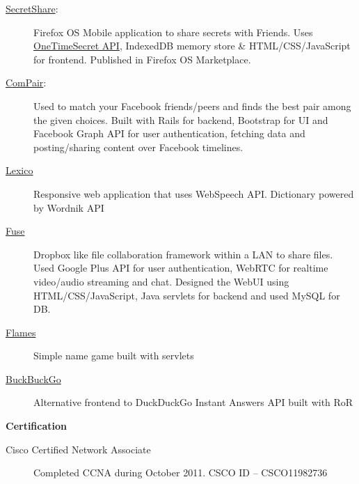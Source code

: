 \documentclass[letterpaper,11pt]{article}
\newcommand{\resheading}[1]{{\large \colorbox{mygrey}{\begin{minipage}{\textwidth}{\textbf{#1 \vphantom{p\^{E}}}}\end{minipage}}}}
\begin{document}
\begin{description}
\item[\href{https://github.com/dtsdwarak/secretshare}{SecretShare}:] { \footnotesize Firefox OS Mobile application to share secrets with Friends. Uses \href{https://onetimesecret.com/}{OneTimeSecret API}, IndexedDB memory store \& HTML/CSS/JavaScript for frontend. Published in Firefox OS Marketplace.}

\item[\href{https://github.com/dtsdwarak/compair}{ComPair}:] { \footnotesize Used to match your Facebook friends/peers and finds the best pair among the given choices. Built with Rails for backend, Bootstrap for UI and Facebook Graph API for user authentication, fetching data and posting/sharing content over Facebook timelines.\color{red}{\bf Won the best creative appliation award at RedHat's OpenShift DevConf 2014, Czech Republic}}

\item[\href{https://dtsdwarak.github.io/lexico/}{Lexico}] { \footnotesize Responsive web application that uses WebSpeech API. Dictionary powered by Wordnik API}

\item[\href{https://github.com/dtsdwarak/fuse}{Fuse}] { \footnotesize Dropbox like file collaboration framework within a LAN to share files. Used Google Plus API for user authentication, WebRTC for realtime video/audio streaming and chat. Designed the WebUI using HTML/CSS/JavaScript, Java servlets for backend and used MySQL for DB.}

\item[\href{https://github.com/dtsdwarak/flames/}{Flames}] { \footnotesize Simple name game built with servlets}

\item[\href{https://github.com/dtsdwarak/buckbuckgo}{BuckBuckGo}] { \footnotesize Alternative frontend to DuckDuckGo Instant Answers API built with RoR}



\end{description}

\resheading{Certification}
\begin{description}

\item[Cisco Certified Network Associate] { \footnotesize Completed CCNA during October 2011. CSCO ID – CSCO11982736}

\end{description}
\end{document}
